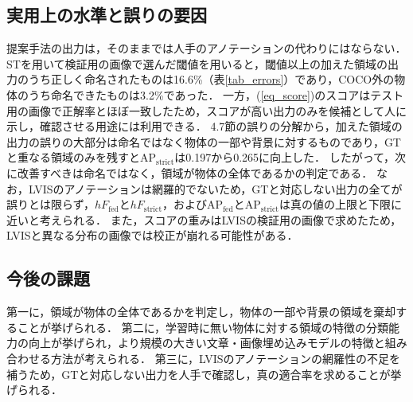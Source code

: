 \subsection{実用上の水準と誤りの要因}
提案手法の出力は，そのままでは人手のアノテーションの代わりにはならない．
STを用いて検証用の画像で選んだ閾値を用いると，閾値以上の加えた領域の出力のうち正しく命名されたものは16.6\%（表\ref{tab_errors}）であり，COCO外の物体のうち命名できたものは3.2\%であった．
一方，(\ref{eq_score})のスコアはテスト用の画像で正解率とほぼ一致したため，スコアが高い出力のみを候補として人に示し，確認させる用途には利用できる．
4.7節の誤りの分解から，加えた領域の出力の誤りの大部分は命名ではなく物体の一部や背景に対するものであり，GTと重なる領域のみを残すとAP$ _{\mathrm{strict}} $は0.197から0.265に向上した．
したがって，次に改善すべきは命名ではなく，領域が物体の全体であるかの判定である．
なお，LVISのアノテーションは網羅的でないため，GTと対応しない出力の全てが誤りとは限らず，$ hF_{\mathrm{fed}} $と$ hF_{\mathrm{strict}} $，およびAP$ _{\mathrm{fed}} $とAP$ _{\mathrm{strict}} $は真の値の上限と下限に近いと考えられる．
また，スコアの重みはLVISの検証用の画像で求めたため，LVISと異なる分布の画像では校正が崩れる可能性がある．

\subsection{今後の課題}
第一に，領域が物体の全体であるかを判定し，物体の一部や背景の領域を棄却することが挙げられる．
第二に，学習時に無い物体に対する領域の特徴の分類能力の向上が挙げられ，より規模の大きい文章・画像埋め込みモデルの特徴と組み合わせる方法が考えられる．
第三に，LVISのアノテーションの網羅性の不足を補うため，GTと対応しない出力を人手で確認し，真の適合率を求めることが挙げられる．
